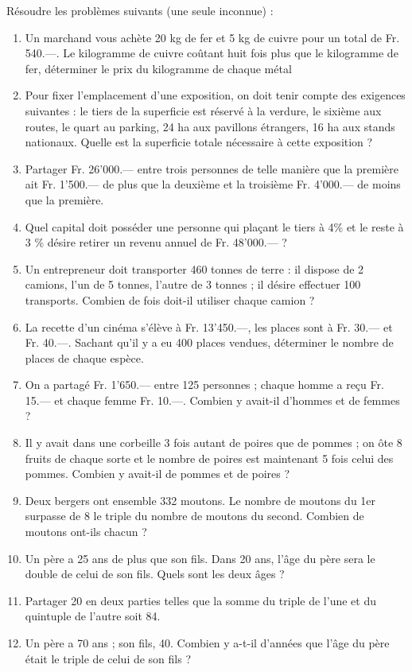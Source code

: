 \begin{exercice}Résoudre les problèmes suivants (une seule inconnue) :
\begin{enumerate}
\item Un marchand vous achète 20 kg de fer et 5 kg de cuivre pour un total de Fr. 540.—. Le kilogramme de cuivre coûtant huit fois plus que le kilogramme de fer, déterminer le prix du kilogramme de chaque métal

\item Pour fixer l’emplacement d’une exposition, on doit tenir compte des exigences suivantes : le tiers de la superficie est réservé à la verdure, le sixième aux routes, le quart au parking, 24 ha aux pavillons étrangers, 16 ha aux stands nationaux. Quelle est la superficie totale nécessaire à cette exposition ?

\item Partager Fr. 26'000.— entre trois personnes de telle manière que la première ait Fr. 1'500.— de plus que la deuxième et la troisième Fr. 4'000.— de moins que la première.

\item Quel capital doit posséder une personne qui plaçant le tiers à 4\% et le reste à 3 \% désire retirer un revenu annuel de Fr. 48'000.— ?

\item Un entrepreneur doit transporter 460 tonnes de terre : il dispose de 2 camions, l’un de 5 tonnes, l’autre de 3 tonnes ; il désire effectuer 100 transports. Combien de fois doit-il utiliser chaque camion ?

\item La recette d’un cinéma s’élève à Fr. 13'450.—, les places sont à Fr. 30.— et Fr. 40.—. Sachant qu’il y a eu 400 places vendues, déterminer le nombre de places de chaque espèce.

\item On a partagé Fr. 1'650.–– entre 125 personnes ; chaque homme a reçu Fr. 15.–– et chaque femme Fr. 10.––. Combien y avait-il d'hommes et de femmes ?

\item Il y avait dans une corbeille 3 fois autant de poires que de pommes ; on ôte 8 fruits de chaque sorte et le nombre de poires est maintenant 5 fois celui des pommes. Combien y avait-il de pommes et de poires ?

\item Deux bergers ont ensemble 332 moutons. Le nombre de moutons du 1er surpasse de 8 le triple du nombre de moutons du second. Combien de moutons ont-ils chacun ?

\item Un père a 25 ans de plus que son fils. Dans 20 ans, l'âge du père sera le double de celui de son fils. Quels sont les deux âges ?

\item Partager 20 en deux parties telles que la somme du triple de l'une et du quintuple de l'autre soit 84.

\item Un père a 70 ans ; son fils, 40. Combien y a-t-il d'années que l'âge du père était le triple de celui de son fils ?
\end{enumerate}
\end{exercice}


